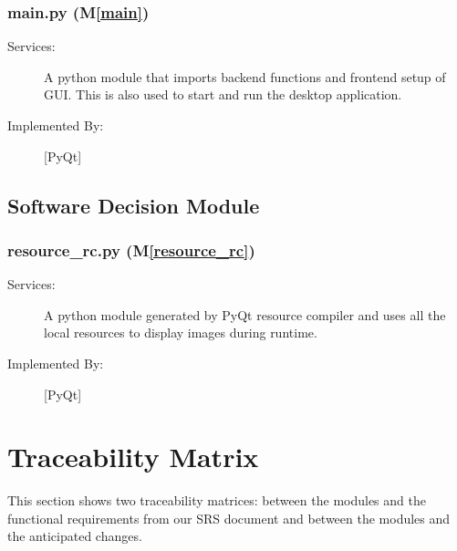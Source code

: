 \documentclass[12pt, titlepage]{article}
\newcommand{\mref}[1]{M\ref{#1}}
\begin{document}
\subsubsection{main.py (\mref{main})}
\begin{description}
\item[Services:] A python module that imports backend functions and frontend setup of GUI. This is also used to start and run the desktop application.
\item[Implemented By:] [PyQt]
\end{description}

\subsection{Software Decision Module}

\subsubsection{resource\_rc.py (\mref{resource_rc})}

\begin{description}

  \item[Services:] A python module generated by PyQt resource compiler and uses all the local resources to display images during runtime.
  \item[Implemented By:] [PyQt] 
  \end{description}

\newpage
\section{Traceability Matrix} \label{SecTM}

This section shows two traceability matrices: between the modules and the
functional requirements from our SRS document and between the modules and the anticipated changes.
\end{document}
